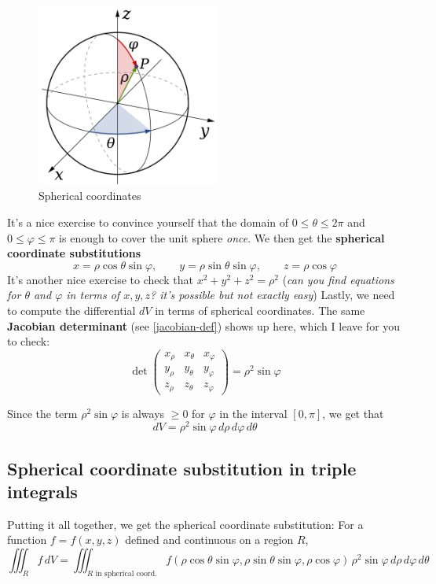 \documentclass[12pt]{article}
\numberwithin{equation}{subsection}
\numberwithin{figure}{subsection}
\theoremstyle{note}
\begin{document}
{\begin{figure}[h!]
\centering 
\includegraphics[width=60mm]{Images/ws9-spherical} 
\caption{Spherical coordinates}
\label{fig-spherical}
\end{figure}

It's a nice exercise to convince yourself that the domain of $0\leq \theta\leq 2\pi$ and $0\leq \varphi \leq \pi$ is enough to cover the unit sphere \textit{once}. We then get the \textbf{spherical coordinate substitutions}
\begin{equation} 
	x=\rho \cos \theta \sin \varphi, \qquad y=\rho \sin \theta \sin \varphi, \qquad z=\rho \cos \varphi \label{spherical-coord}
\end{equation}
It's another nice exercise to check that $x^2+y^2+z^2=\rho^2$ (\textit{can you find equations for $\theta$ and $\varphi$ in terms of $x,y,z$? it's possible but not exactly easy}) Lastly, we need to compute the differential $dV$ in terms of spherical coordinates. The same \textbf{Jacobian determinant} (see \ref{jacobian-def}) shows up here, which I leave for you to check: \[ \det \begin{pmatrix} x_{\rho} & x_{\theta} & x_{\varphi} \\ y_{\rho} & y_{\theta} & y_{\varphi} \\ z_{\rho} & z_{\theta} & z_{\varphi} \end{pmatrix} =\rho^2\sin\varphi\] 


Since the term $\rho^2\sin\varphi$ is always $\geq 0$ for $\varphi$ in the interval $[0,\pi]$, we get that \begin{equation} dV= \rho^2 \sin\varphi \, d\rho \,d\varphi\, d\theta \label{dV-spherical} \end{equation}

\subsection{Spherical coordinate substitution in triple integrals} Putting it all together, we get the spherical coordinate substitution: For a function $f=f(x,y,z)$ defined and continuous on a region $R$, \begin{equation}\iiint_R f\,dV=\iiint_{\text{$R$ in spherical coord.}} f(\rho\cos\theta\sin\varphi, \rho\sin\theta\sin\varphi, \rho\cos\varphi)\, \rho^2 \sin\varphi \,d\rho\,d\varphi \, d\theta \end{equation}

}
\end{document}
